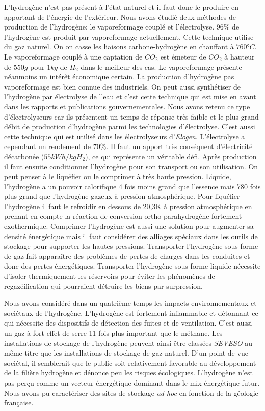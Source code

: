 \documentclass[11pt,french,a4paper]{article}
\begin{document}
L'hydrogène n'est pas présent à l'état naturel et il faut donc le produire en apportant de l'énergie de l'extérieur. Nous avons étudié deux méthodes de production de l'hydrogène: le vaporeformage couplé et l'électrolyse. 96\% de l'hydrogène est produit par vaporeformage actuellement. Cette technique utilise du gaz naturel. On on casse les liaisons carbone-hydrogène en chauffant à $760°C$. Le vaporeformage couplé à une captation de $CO_2$ est émeteur de $CO_2$ à hauteur de $550g $ pour $1kg$ de $H_2$ dans le meilleur des cas. Le vaporeformage présente néanmoins un intérêt économique certain. La production d'hydrogène pas vaporeformage est bien connue des industriels. On peut aussi synthétiser de l'hydrogène par électrolyse de l'eau et c'est cette technique qui est mise en avant dans les rapports et publications gouvernementales. Nous avons retenu ce type d'électrolyseurs car ils présentent un temps de réponse très faible et le plus grand débit de production d'hydrogène parmi les technologies d'électrolyse. C'est aussi cette technique qui est utilisé dans les électrolyseurs d'\emph{Elogen}. L'électrolyse a cependant un rendement de $70\%$. Il faut un apport très conséquent d'électricité décarbonée ($55kWh/kg H_2$), ce qui représente un véritable défi. Après production il faut ensuite conditionner l'hydrogène pour son transport ou son utilisation. On peut penser à le liquéfier ou le comprimer à très haute pression. Liquide, l'hydrogène a un pouvoir calorifique 4 fois moins grand que l'essence mais 780 fois plus grand que l'hydrogène gazeux à pression atmosphérique. Pour liquéfier l'hydrogène il faut le refroidir en dessous de 20,3K à pression atmosphérique en prenant en compte la réaction de conversion ortho-parahydrogène fortement exothermique. Comprimer l'hydrogène est aussi une solution pour augmenter sa densité énergétique mais il faut considérer des alliages spéciaux dans les outils de stockage pour supporter les hautes pressions. Transporter l'hydrogène sous forme de gaz fait apparaître des problèmes de pertes de charges dans les conduites et donc des pertes énergétiques. Transporter l'hydrogène sous forme liquide nécessite d'isoler thermiquement les réservoirs pour éviter les phénomènes de regazéification qui pourraient détruire les biens par surpression.

Nous avons considéré dans un quatrième temps les impacts environnementaux et sociétaux de l'hydrogène. L'hydrogène est fortement inflammable et détonnant ce qui nécessite des dispositifs de détection des fuites et de ventilation. C'est aussi un gaz à fort effet de serre 11 fois plus important que le méthane. Les installations de stockage de l'hydrogène peuvent ainsi être classées \textit{SEVESO} au même titre que les installations de stockage de gaz naturel. D'un point de vue sociétal, il semblerait que le public soit relativement favorable au développement de la filière hydrogène et dénonce peu les risques écologiques. L'hydrogène n'est pas perçu comme un vecteur énergétique dominant dans le mix énergétique futur. Nous avons pu caractériser des sites de stockage \textit{ad hoc} en fonction de la géologie française.
\end{document}
